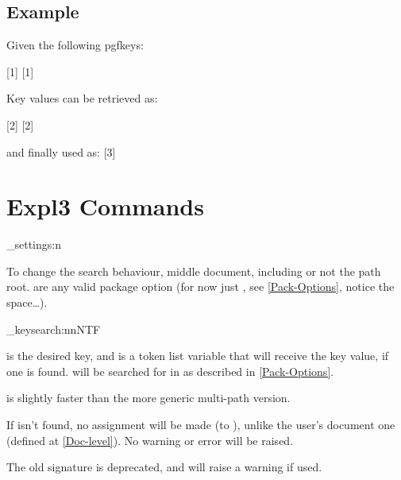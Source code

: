 \documentclass[10pt]{article}
\begin{document}

\subsection{Example}
Given the following pgfkeys:

[1]
[1]

Key values can be retrieved as:

[2]
[2]

and finally used as:
[3]

\section{Expl3 Commands}\label{expl-ones}



\begin{codedescribe}[code,new=2025/05/27]{\pgfkeysearch_settings:n}
\begin{codesyntax}%
\end{codesyntax}
To change the search behaviour, middle document, including or not the path root.  are any valid package option (for now just , see \ref{Pack-Options}, notice the space\ldots).
\end{codedescribe}


\begin{codedescribe}[code,update=2025/05/26]{\pgfkeysearch_keysearch:nnNTF}
\begin{codesyntax}%
\end{codesyntax}
 is the desired key, and  is a token list variable that will receive the key value, if one is found.
 will be searched for in  as described in \ref{Pack-Options}. 

 is  slightly faster than the more generic multi-path version.
\end{codedescribe}

\begin{tsremark}
  If  isn't found, no assignment will be made (to ), unlike the user's document one (defined at \ref{Doc-level}). No warning or error will be raised.
\end{tsremark}
\begin{tsremark}
  The old signature  is deprecated, and will raise a warning if used.
\end{tsremark}
\end{document}
